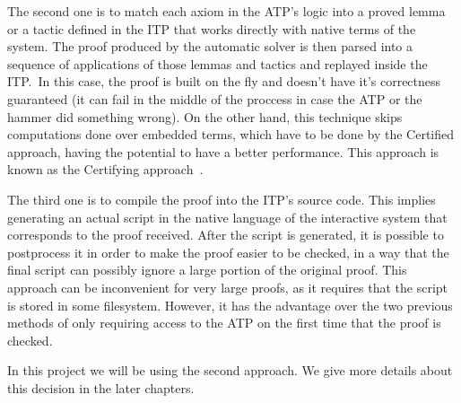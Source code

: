 The second one is to match each axiom in the ATP's logic into a proved lemma or a tactic
defined in the ITP that works directly with native terms of the system.
The proof produced by the automatic solver is then parsed into a sequence of applications
of those lemmas and tactics and replayed inside the ITP.\ In this case, the proof is built
on the fly and doesn't have it's correctness guaranteed (it can fail in the middle of the
proccess in case the ATP or the hammer did something wrong). On the other hand,
this technique skips computations done over embedded terms, which have to be done by the
Certified approach, having the potential to have a better
performance. This approach is known as the Certifying approach\ \cite{snipe}.

The third one is to compile the proof into the ITP's source code. This implies generating
an actual script in the native language of the interactive system
that corresponds to the proof received. After the script is generated, it is
possible to postprocess
it in order to make the proof easier to be checked,
in a way that the final script can possibly ignore a large portion of the
original proof. This approach can be inconvenient for very large proofs,
as it requires that the script is stored in some filesystem. However,
it has the advantage over the two previous methods of only requiring access to the ATP
on the first time that the proof is checked.

In this project we will be using the second approach. We give more details about this
decision in the later chapters.
